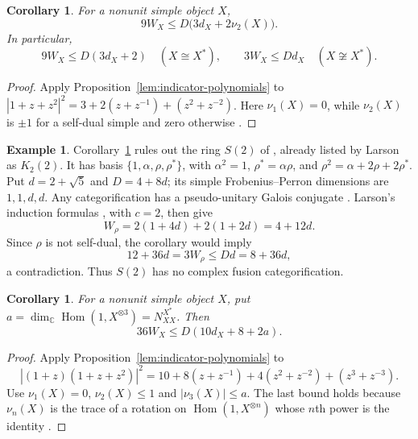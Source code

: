 \documentclass[11pt]{amsart}
\newtheorem{corollary}[theorem]{Corollary}
\theoremstyle{definition}
\newtheorem{example}[theorem]{Example}
\newcommand{\C}{\mathbb C}
\numberwithin{equation}{section}
\begin{document}
\begin{corollary}\label{cor:second-indicator}
For a nonunit simple object $X$,
\[
 9W_X\leq D\bigl(3d_X+2\nu_2(X)\bigr).
\]
In particular,
\[
 9W_X\leq D(3d_X+2)\quad(X\cong X^*),\qquad
 3W_X\leq Dd_X\quad(X\not\cong X^*).
\]
\end{corollary}
\begin{proof}
Apply Proposition~\ref{lem:indicator-polynomials} to
$|1+z+z^2|^2=3+2(z+z^{-1})+(z^2+z^{-2})$.
Here $\nu_1(X)=0$, while $\nu_2(X)$ is $\pm1$ for a self-dual simple
and zero otherwise \cite[Definition~3.1 and Theorem~5.1]{NgSchauenburgHigher}.
\end{proof}

\begin{example}\label{ex:S(2)}
Corollary~\ref{cor:second-indicator} rules out the ring $S(2)$ of
\cite[\S4, Theorem~4.1]{EIP}, already listed by Larson
\cite[Theorem~1.1(6)]{Larson} as $K_2(2)$. It has basis
$\{1,\alpha,\rho,\rho^*\}$, with
$\alpha^2=1$, $\rho^*=\alpha\rho$, and
$\rho^2=\alpha+2\rho+2\rho^*$.
Put $d=2+\sqrt5$ and $D=4+8d$; its simple Frobenius--Perron
dimensions are $1,1,d,d$. Any categorification has a pseudo-unitary
Galois conjugate \cite[Lemma~3.1]{Schopieray}. Larson's induction
formulas \cite[Proposition~5.2]{Larson}, with $c=2$, then give
\[
 W_\rho=2(1+4d)+2(1+2d)=4+12d.
\]
Since $\rho$ is not self-dual, the corollary would imply
\[
 12+36d=3W_\rho\leq Dd=8+36d,
\]
a contradiction. Thus $S(2)$ has no complex fusion categorification.
\end{example}

\begin{corollary}\label{cor:third-indicator}
For a nonunit simple object $X$, put
$a=\dim_{\C}\operatorname{Hom}(1,X^{\otimes3})=N_{XX}^{X^*}$. Then
\[
 36W_X\leq D(10d_X+8+2a).
\]
\end{corollary}
\begin{proof}
Apply Proposition~\ref{lem:indicator-polynomials} to
\[
 |(1+z)(1+z+z^2)|^2
 =10+8(z+z^{-1})+4(z^2+z^{-2})+(z^3+z^{-3}).
\]
Use $\nu_1(X)=0$, $\nu_2(X)\leq1$ and $|\nu_3(X)|\leq a$.
The last bound holds because $\nu_n(X)$ is the trace of a rotation on
$\operatorname{Hom}(1,X^{\otimes n})$ whose $n$th power is the identity
\cite[Definition~3.1 and Theorem~5.1]{NgSchauenburgHigher}.
\end{proof}
\end{document}
